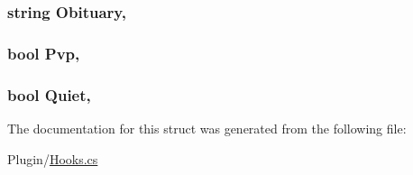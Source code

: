 \subsubsection[{Obituary}]{\setlength{\rightskip}{0pt plus 5cm}string Obituary\hspace{0.3cm}{\ttfamily [get]}, {\ttfamily [set]}}\label{structOTA_1_1Plugin_1_1HookArgs_1_1PlayerHurt_a984f15b6811029d1850ee945c056d08f}
\hypertarget{structOTA_1_1Plugin_1_1HookArgs_1_1PlayerHurt_ad53f57ef2f78ef6c1d83f45961a75487}{}
\subsubsection[{Pvp}]{\setlength{\rightskip}{0pt plus 5cm}bool Pvp\hspace{0.3cm}{\ttfamily [get]}, {\ttfamily [set]}}\label{structOTA_1_1Plugin_1_1HookArgs_1_1PlayerHurt_ad53f57ef2f78ef6c1d83f45961a75487}
\hypertarget{structOTA_1_1Plugin_1_1HookArgs_1_1PlayerHurt_afc3e36491a803235fa4c4fa7a0a3733e}{}
\subsubsection[{Quiet}]{\setlength{\rightskip}{0pt plus 5cm}bool Quiet\hspace{0.3cm}{\ttfamily [get]}, {\ttfamily [set]}}\label{structOTA_1_1Plugin_1_1HookArgs_1_1PlayerHurt_afc3e36491a803235fa4c4fa7a0a3733e}


The documentation for this struct was generated from the following file\+:\begin{DoxyCompactItemize}
\item 
Plugin/\hyperlink{Hooks_8cs}{Hooks.\+cs}\end{DoxyCompactItemize}
